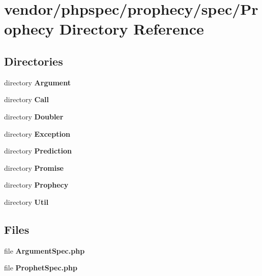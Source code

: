 \section{vendor/phpspec/prophecy/spec/\+Prophecy Directory Reference}
\label{dir_018e3b928cdcca4e1bb5ad773f8ce9ec}
\subsection*{Directories}
\begin{DoxyCompactItemize}
\item 
directory {\bf Argument}
\item 
directory {\bf Call}
\item 
directory {\bf Doubler}
\item 
directory {\bf Exception}
\item 
directory {\bf Prediction}
\item 
directory {\bf Promise}
\item 
directory {\bf Prophecy}
\item 
directory {\bf Util}
\end{DoxyCompactItemize}
\subsection*{Files}
\begin{DoxyCompactItemize}
\item 
file {\bf Argument\+Spec.\+php}
\item 
file {\bf Prophet\+Spec.\+php}
\end{DoxyCompactItemize}
